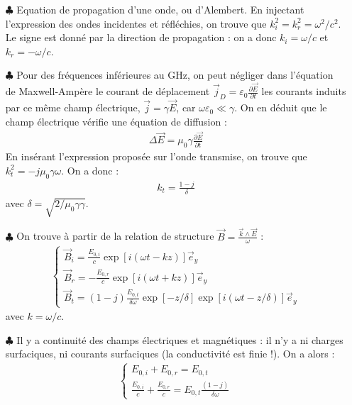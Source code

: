 \documentclass{report}
\begin{document}
\begin{itemize}
	
	\item[$\clubsuit$] Equation de propagation d'une onde, ou d'Alembert. En injectant l'expression des ondes incidentes et réfléchies, on trouve que $k_i^2=k_r^2=\omega^2/c^2$. Le signe est donné par la direction de propagation : on a donc $k_i=\omega/c$ et $k_r=-\omega/c$.
	
	\item[$\clubsuit$] Pour des fréquences inférieures au GHz, on peut négliger dans l'équation de Maxwell-Ampère le courant de déplacement $\vec{j}_D=\varepsilon_0\frac{\partial \vec{E}}{\partial t}$ les courants induits par ce même champ électrique, $\vec{j}=\gamma\vec{E}$, car $\omega\varepsilon_0\ll\gamma$. On en déduit que le champ électrique vérifie une équation de diffusion :
	\begin{align*}
		\Delta \vec{E}=\mu_0\gamma\frac{\partial \vec{E}}{\partial t}
	\end{align*}
	En insérant l'expression proposée sur l'onde transmise, on trouve que $k_t^2=-j\mu_0\gamma\omega$. On a donc :
	\begin{align*}
		k_t = \frac{1-j}{\delta}
	\end{align*}
	avec $\delta=\sqrt{2/\mu_0\gamma\gamma}$.
	
	\item[$\clubsuit$] On trouve à partir de la relation de structure $\vec{B}=\frac{\vec{k}\wedge\vec{E}}{\omega}$ :
	\begin{align}
    \begin{cases}
        \vec{B}_i=\frac{E_{0,i}}{c}\exp[i(\omega t-kz)]\vec{e}_y\\
     	\vec{B}_r=-\frac{E_{0,r}}{c}\exp[i(\omega t+kz)]\vec{e}_y\\
     	\vec{B}_t=(1-j)\frac{E_{0,t}}{\delta\omega}\exp[-z/\delta]\exp[i(\omega t-z/\delta)]\vec{e}_y
    \end{cases}  
	\end{align}
	avec $k=\omega/c$.
	
	\item[$\clubsuit$] Il y a continuité des champs électriques et magnétiques : il n'y a ni charges surfaciques, ni courants surfaciques (la conductivité est finie !). On a alors :
	\begin{align}
    \begin{cases}
        E_{0,i} + E_{0,r} =E_{0,t}\\
     	\frac{E_{0,i}}{c} + \frac{E_{0,r}}{c} =E_{0,t}\frac{(1-j)}{\delta\omega}
    \end{cases}  
	\end{align}
	

\end{itemize}
\end{document}
